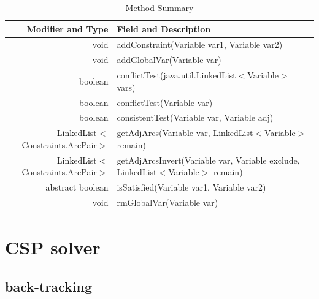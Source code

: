 \documentclass{article}
\begin{document}
\begin{table}[h]
\begin{center}
  \begin{tabular}{ |r | l | }
    \hline
    Modifier and Type & Field and Description \\ \hline
void	&addConstraint(Variable var1, Variable var2)                                                                                   \\ \hline
void	&addGlobalVar(Variable var)                                                                                                    \\ \hline
boolean	&conflictTest(java.util.LinkedList$<$Variable$>$ vars)                                                                           \\ \hline
boolean	&conflictTest(Variable var)                                                                                                  \\ \hline
boolean	&consistentTest(Variable var, Variable adj)                                                                                  \\ \hline
LinkedList$<$Constraints.ArcPair$>$&	getAdjArcs(Variable var, LinkedList$<$Variable$>$ remain)                          \\ \hline
LinkedList$<$Constraints.ArcPair$>$	&getAdjArcsInvert(Variable var, Variable exclude, LinkedList$<$Variable$>$ remain)   \\ \hline
abstract boolean&	isSatisfied(Variable var1, Variable var2)                                                                          \\ \hline
void	&rmGlobalVar(Variable var)                                                                                                     \\ \hline

  \end{tabular}
\caption{Method Summary}
\end{center}
\end{table}









\clearpage
\section{CSP solver}
\subsection{back-tracking}
\end{document}
